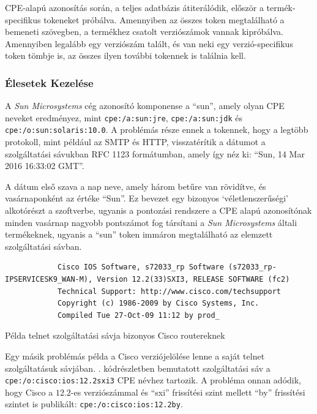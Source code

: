 \documentclass[a4paper,12pt]{article}
\begin{document}
	CPE-alapú azonosítás során, a teljes adatbázis átiterálódik, először a termék-specifikus tokeneket próbálva. Amennyiben az összes token megtalálható a bemeneti szövegben, a termékhez csatolt verziószámok vannak kipróbálva. Amennyiben legalább egy verziószám talált, és van neki egy verzió-specifikus token tömbje is, az összes ilyen további tokennek is találnia kell.
	
\subsubsection{Élesetek Kezelése} \label{ssec:cpeedges}

	A \textit{Sun Microsystems} cég azonosító komponense a ``sun'', amely olyan CPE neveket eredményez, mint \texttt{cpe:/a:sun:jre}, \texttt{cpe:/a:sun:jdk} és \texttt{cpe:/o:sun:solaris:10.0}. A problémás része ennek a tokennek, hogy a legtöbb protokoll, mint például az SMTP és HTTP, visszatérítik a dátumot a szolgáltatási sávukban RFC 1123 formátumban\cite{rfc2616}, amely így néz ki: ``Sun, 14 Mar 2016 16:33:02 GMT''.
	
	A dátum első szava a nap neve, amely három betűre van rövidítve, és vasárnaponként az értéke ``Sun''. Ez bevezet egy bizonyos `véletlenszerűségi' alkotórészt a szoftverbe, ugyanis a pontozási rendszere a CPE alapú azonosítónak minden vasárnap nagyobb pontszámot fog társítani a \textit{Sun Microsystems} általi termékeknek, ugyanis a ``sun'' token immáron megtalálható az elemzett szolgáltatási sávban.
	
	\begin{listing}[H]
		\begin{verbatim}
			Cisco IOS Software, s72033_rp Software (s72033_rp-IPSERVICESK9_WAN-M), Version 12.2(33)SXI3, RELEASE SOFTWARE (fc2)
			Technical Support: http://www.cisco.com/techsupport
			Copyright (c) 1986-2009 by Cisco Systems, Inc.
			Compiled Tue 27-Oct-09 11:12 by prod_
		\end{verbatim}
		\caption{Példa telnet szolgáltatási sávja bizonyos Cisco routereknek}
		\label{ciscosvcbnr}
	\end{listing}

	Egy másik problémás példa a Cisco verziójelölése lenne a saját telnet szolgáltatásuk sávjában. \Az{\ref{ciscosvcbnr}}. kódrészletben bemutatott szolgáltatási sáv a \texttt{cpe:/o:cisco:ios:12.2sxi3} CPE névhez tartozik. A probléma onnan adódik, hogy Cisco a $12.2$-es verziószámmal és ``sxi'' frissítési szint mellett ``by'' frissítési szintet is publikált: \texttt{cpe:/o:cisco:ios:12.2by}.
	
\end{document}
